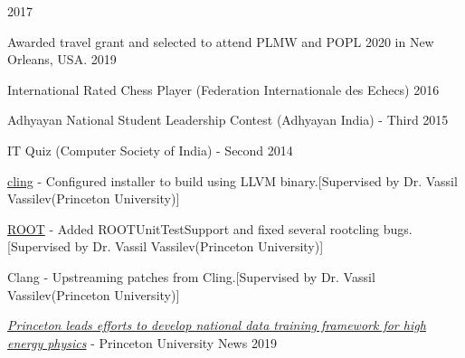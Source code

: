 \documentclass[10pt, letterpaper]{fulldeps}
\begin{document}
\hfill{2017}\\
\vspace{-15pt}

%
%

%
%
\begin{tightitemize}
    \item Awarded travel grant and selected to attend PLMW and POPL 2020 in New Orleans, USA. \hfill{2019}
    \item International Rated Chess Player (Federation Internationale des Echecs) \hfill{2016}
    \item Adhyayan National Student Leadership Contest (Adhyayan India) - Third \hfill{2015}
    \item IT Quiz (Computer Society of India) - Second \hfill{2014}
\end{tightitemize}

\begin{tightitemize}
\item {\href{https://github.com/root-project/cling}{cling}} - Configured installer to build using LLVM binary.[Supervised by Dr. Vassil Vassilev(Princeton University)]
\item {\href{https://github.com/root-project/root}{ROOT}} - Added ROOTUnitTestSupport and fixed several rootcling bugs.[Supervised by Dr. Vassil Vassilev(Princeton University)]
\item {Clang} - Upstreaming patches from Cling.[Supervised by Dr. Vassil Vassilev(Princeton University)]
\end{tightitemize}

\begin{tightitemize}
\item \textit{\href{https://www.princeton.edu/news/2019/08/19/princeton-leads-efforts-develop-national-data-training-framework-high-energy}{Princeton leads efforts to develop national data training framework for high energy physics}} - Princeton University News \hfill{2019}
\end{tightitemize}
\end{document}
